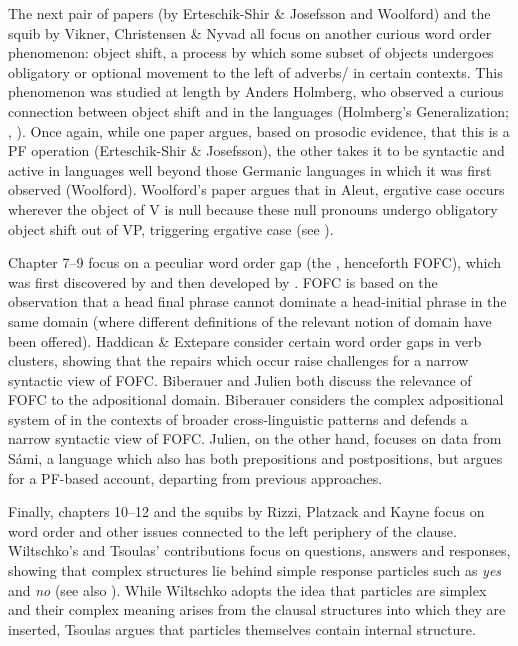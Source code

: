 \documentclass[output=paper]{langsci/langscibook}
\begin{document}
The next pair of papers (by Erteschik-Shir \& Josefsson and Woolford) and the squib by Vikner, Christensen \& Nyvad all focus on another curious word order phenomenon: object shift, a process by which some subset of objects undergoes obligatory or optional movement to the left of adverbs\slash {} in certain contexts. This phenomenon was studied at length by Anders Holmberg, who observed a curious connection between object shift and  in the  languages (Holmberg’s Generalization; \citealt{Holmberg1986}, \citeyear{Holmberg1999}). Once again, while one paper argues, based on prosodic evidence, that this is a PF operation (Erteschik-Shir \& Josefsson), the other takes it to be syntactic and active in languages well beyond those Germanic languages in which it was first observed (Woolford). Woolford’s paper argues that in Aleut, ergative case occurs wherever the object of V is null because these null pronouns undergo obligatory object shift out of VP, triggering ergative case (see \citealt{woolford2015ergativity}).\largerpage 

Chapter 7–9 focus on a peculiar word order gap (the , henceforth FOFC), which was first discovered by \citet{Holmberg2000} and then developed by \citet{biberaueretal2014,BiberauerEtAl2017book}. FOFC is based on the observation that a head final phrase cannot dominate a head-initial phrase in the same domain (where different definitions of the relevant notion of domain have been offered). Haddican \& Extepare consider certain word order gaps in  verb clusters, showing that the repairs which occur raise challenges for a narrow syntactic view of FOFC. Biberauer and Julien both discuss the relevance of FOFC to the adpositional domain. Biberauer considers the complex adpositional system of  in the contexts of broader cross-linguistic patterns and defends a narrow syntactic view of FOFC. Julien, on the other hand, focuses on data from Sámi, a language which also has both prepositions and postpositions, but argues for a PF-based account, departing from previous approaches.   

Finally, chapters 10–12 and the squibs by Rizzi, Platzack and Kayne focus on word order and other issues connected to the left periphery of the clause. Wiltschko’s and Tsoulas’ contributions focus on questions, answers and responses, showing that complex structures lie behind simple response particles such as \textit{yes} and \textit{no} (see also \citealt{holmberg:15}). While Wiltschko adopts the idea that particles are simplex and their complex meaning arises from the clausal structures into which they are inserted, Tsoulas argues that particles themselves contain internal structure. 
\end{document}

